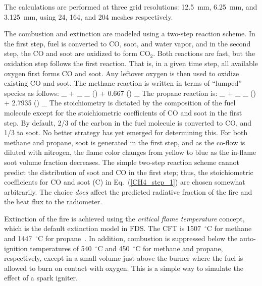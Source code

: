 The calculations are performed at three grid resolutions: 12.5~mm, 6.25~mm, and 3.125~mm, using 24, 164, and 204 meshes respectively.

The combustion and extinction are modeled using a two-step reaction scheme. In the first step, fuel is converted to CO, soot, and water vapor, and in the second step, the CO and soot are oxidized to form CO$_2$. Both reactions are fast, but the oxidation step follows the first reaction. That is, in a given time step, all available oxygen first forms CO and soot. Any leftover oxygen is then used to oxidize existing CO and soot. The methane reaction is written in terms of ``lumped'' species as follows:
\be
{}_ \; +  \; _ \longrightarrow
{}_ \label{CH4_step_1}
\ee
\be
() + 0.667 \; () \longrightarrow  {}_
\ee
The propane reaction is:
\be
{}_ \; +  \; _ \longrightarrow
{}_
\ee
\be
() + 2.7935 \; () \longrightarrow  {}_
\ee
The stoichiometry is dictated by the composition of the fuel molecule except for the stoichiometric coefficients of CO and soot in the first step. By default, 2/3 of the carbon in the fuel molecule is converted to CO, and 1/3 to soot. No better strategy has yet emerged for determining this. For both methane and propane, soot is generated in the first step, and as the co-flow is diluted with nitrogen, the flame color changes from yellow to blue as the in-flame soot volume fraction decreases. The simple two-step reaction scheme cannot predict the distribution of soot and CO in the first step; thus, the stoichiometric coefficients for CO and soot (C) in Eq.~(\ref{CH4_step_1}) are chosen somewhat arbitrarily. The choice {\em does} affect the predicted radiative fraction of the fire and the heat flux to the radiometer.

Extinction of the fire is achieved using the {\em critical flame temperature} concept, which is the default extinction model in FDS. The CFT is 1507~$^\circ$C for methane and 1447~$^\circ$C for propane~\cite{SFPE:Beyler}. In addition, combustion is suppressed below the auto-ignition temperatures of 540~$^\circ$C and 450~$^\circ$C for methane and propane, respectively, except in a small volume just above the burner where the fuel is allowed to burn on contact with oxygen. This is a simple way to simulate the effect of a spark igniter.

